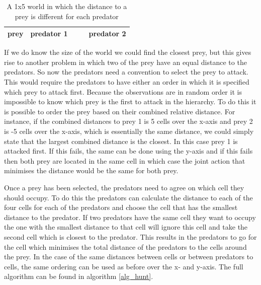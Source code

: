 \documentclass[10pt]{article}
\begin{document}
\begin{table}[h!tb]
\centering
	\caption{A 1x5 world in which the distance to a prey is different for each predator}
\label{tab_disprob}
\begin{tabular}{|c|c|c|c|c|}
\hline
	prey & predator 1& & &predator 2 \\
\hline
\end{tabular}
\end{table}

If we do know the size of the world we could find the closest prey, but this gives rise to another problem in which two of the prey have an equal distance to the predators. So now the predators need a convention to select the prey to attack. This would require the predators to have either an order in which it is specified which prey to attack first. Because the observations are in random order it is impossible to know which prey is the first to attack in the hierarchy. To do this it is possible to order the prey based on their combined relative distance. For instance, if the combined distances to prey 1 is 5 cells over the x-axis and prey 2 is -5 cells over the x-axis, which is essentially the same distance, we could simply state that the largest combined distance is the closest. In this case prey 1 is attacked first. If this fails, the same can be done using the y-axis and if this fails then both prey are located in the same cell in which case the joint action that minimises the distance would be the same for both prey.

Once a prey has been selected, the predators need to agree on which cell they should occupy. To do this the predators can calculate the distance to each of the four cells for each of the predators and choose the cell that has the smallest distance to the predator. If two predators have the same cell they want to occupy the one with the smallest distance to that cell will ignore this cell and take the second cell which is closest to the predator. This results in the predators to go for the cell which minimises the total distance of the predators to the cells around the prey. In the case of the same distances between cells or between predators to cells, the same ordering can be used as before over the x- and y-axis. The full algorithm can be found in algorithm \ref{alg_hunt}.
\end{document}
